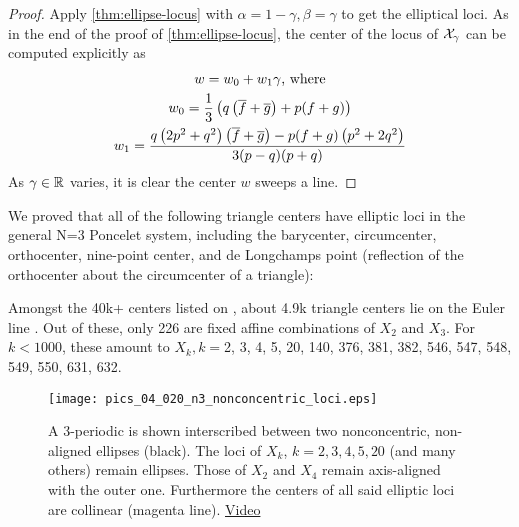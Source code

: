 \begin{proof}
Apply   \cref{thm:ellipse-locus} with $\alpha=1-\gamma, \beta=\gamma$ to get the elliptical loci. As in the end of the proof of  \cref{thm:ellipse-locus}, the center of the locus of $\mathcal{X}_\gamma$ can be computed explicitly as 
\begin{gather*}
    w=w_0+w_1 \gamma \text{, where}\\
    w_0=\frac{1}{3} \left(q \left(\overline{f}+\overline{g}\right)+p (f+g)\right)\\
    w_1=\frac{q \left(2 p^2+q^2\right) \left(\overline{f}+\overline{g}\right)-p (f+g) \left(p^2+2 q^2\right)}{3 (p-q) (p+q)}
\end{gather*}
As $\gamma\in\mathbb{R}$ varies, it is clear the center $w$ sweeps a line.
\end{proof}

We proved that all of the following triangle centers have elliptic loci in the general N=3 Poncelet system, including the barycenter, circumcenter, orthocenter, nine-point center, and de Longchamps point (reflection of the orthocenter  about the circumcenter of a triangle):

\begin{observation}
Amongst the 40k+ centers listed on \cite{etc}, about 4.9k triangle centers lie on the Euler line \cite{etc-central-lines}. Out of these, only 226 are fixed affine combinations of $X_2$ and $X_3$. For $k<1000$, these amount to $X_k,k=${\small 2, 3, 4, 5, 20, 140, 376, 381, 382, 546, 547, 548, 549, 550, 631, 
632}.
\label{obs:affine-euler-line}
\end{observation}

\begin{figure}
     \centering
     \texttt{[image: pics\_04\_020\_n3\_nonconcentric\_loci.eps]}
     \caption{A 3-periodic is shown interscribed between two nonconcentric, non-aligned ellipses (black). The loci of $X_k$, $k=2,3,4,5,20$ (and many others) remain ellipses. Those of $X_2$ and $X_4$ remain axis-aligned with the outer one. Furthermore the centers of all said elliptic loci are collinear (magenta line). \href{https://youtu.be/p1medAei_As}{Video}}
     \label{fig:nonconcentric-xns}
 \end{figure}
 
 
